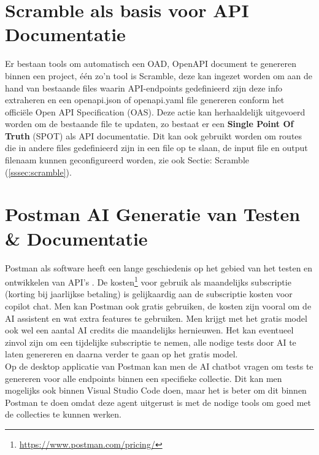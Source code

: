 \section{Scramble als basis voor API Documentatie}
\label{sec:scramblealsbasisvoorapidocumentatie}

Er bestaan tools om automatisch een OAD, OpenAPI document te genereren binnen een project, één zo'n tool is Scramble, deze kan ingezet worden om aan de hand van bestaande files waarin API-endpoints gedefinieerd zijn deze info extraheren en een openapi.json of openapi.yaml file genereren conform het officiële Open API Specification (OAS). Deze actie kan herhaaldelijk uitgevoerd worden om de bestaande file te updaten, zo bestaat er een \textbf{Single Point Of Truth} (SPOT) als API documentatie. Dit kan ook gebruikt worden om routes die in andere files gedefinieerd zijn in een file op te slaan, de input file en output filenaam kunnen geconfigureerd worden, zie ook Sectie: Scramble (\ref{sssec:scramble}).

\section{Postman AI Generatie van Testen \& Documentatie}
\label{sec:postmanaigeneratievantestenendocumentatie}
Postman als software heeft een lange geschiedenis op het gebied van het testen en ontwikkelen van API's \autocite{Lane2021}. De kosten\footnote{\href{https://www.postman.com/pricing/}{https://www.postman.com/pricing/}} voor gebruik als maandelijks subscriptie (korting bij jaarlijkse betaling) is gelijkaardig aan de subscriptie kosten voor copilot chat. Men kan Postman ook gratis gebruiken, de kosten zijn vooral om de AI assistent en wat extra features te gebruiken. Men krijgt met het gratis model ook wel een aantal AI credits die maandelijks hernieuwen. Het kan eventueel zinvol zijn om een tijdelijke subscriptie te nemen, alle nodige tests door AI te laten genereren en daarna verder te gaan op het gratis model. \\

Op de desktop applicatie van Postman kan men de AI chatbot vragen om tests te genereren voor alle endpoints binnen een specifieke collectie. Dit kan men mogelijks ook binnen Visual Studio Code doen, maar het is beter om dit binnen Postman te doen omdat deze agent uitgerust is met de nodige tools om goed met de collecties te kunnen werken. \\ %

